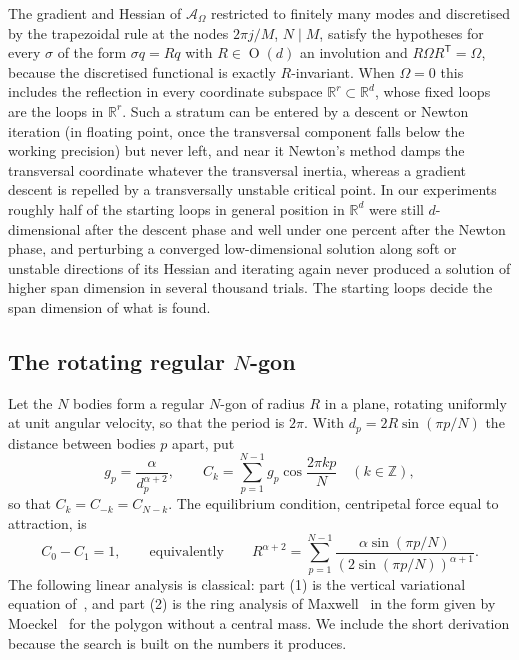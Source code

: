 \documentclass[11pt]{amsart}
\theoremstyle{definition}
\newcommand{\R}{\mathbb{R}}
\newcommand{\Z}{\mathbb{Z}}
\newcommand{\act}{\mathcal{A}}
\DeclareMathOperator{\Orth}{O}
\begin{document}
The gradient and Hessian of $\act_\Omega$ restricted to finitely many modes and discretised by the trapezoidal rule at the nodes $2\pi j/M$, $N\mid M$, satisfy the hypotheses for every $\sigma$ of the form $\sigma q=Rq$ with $R\in\Orth(d)$ an involution and $R\Omega R^{\mathsf T}=\Omega$, because the discretised functional is exactly $R$-invariant. When $\Omega=0$ this includes the reflection in every coordinate subspace $\R^r\subset\R^d$, whose fixed loops are the loops in $\R^r$. Such a stratum can be entered by a descent or Newton iteration (in floating point, once the transversal component falls below the working precision) but never left, and near it Newton's method damps the transversal coordinate whatever the transversal inertia, whereas a gradient descent is repelled by a transversally unstable critical point. In our experiments roughly half of the starting loops in general position in $\R^d$ were still $d$-dimensional after the descent phase and well under one percent after the Newton phase, and perturbing a converged low-dimensional solution along soft or unstable directions of its Hessian and iterating again never produced a solution of higher span dimension in several thousand trials. The starting loops decide the span dimension of what is found.

\subsection{The rotating regular \texorpdfstring{$N$}{N}-gon}
Let the $N$ bodies form a regular $N$-gon of radius $R$ in a plane, rotating uniformly at unit angular velocity, so that the period is $2\pi$. With $d_p=2R\sin(\pi p/N)$ the distance between bodies $p$ apart, put
\[
g_p=\frac{\alpha}{d_p^{\alpha+2}},\qquad C_k=\sum_{p=1}^{N-1}g_p\cos\frac{2\pi kp}{N}\quad(k\in\Z),
\]
so that $C_k=C_{-k}=C_{N-k}$. The equilibrium condition, centripetal force equal to attraction, is
\begin{equation}\label{eq:radius}
C_0-C_1=1,\qquad\text{equivalently}\qquad R^{\alpha+2}=\sum_{p=1}^{N-1}\frac{\alpha\sin(\pi p/N)}{(2\sin(\pi p/N))^{\alpha+1}} .
\end{equation}
The following linear analysis is classical: part (1) is the vertical variational equation of~\cite{ChencinerFejoz2005,ChencinerFejoz2009}, and part (2) is the ring analysis of Maxwell~\cite{Maxwell1859} in the form given by Moeckel~\cite{Moeckel1995} for the polygon without a central mass. We include the short derivation because the search is built on the numbers it produces.
\end{document}

